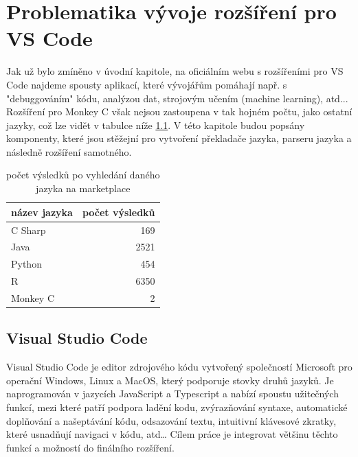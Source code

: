 \chapter{Problematika vývoje rozšíření pro VS Code}

Jak už bylo zmíněno v úvodní kapitole, na oficiálním webu s rozšířeními pro VS Code \cite{marketplace} najdeme spousty aplikací, které vývojářům pomáhají např. s "debuggováním" kódu, analýzou dat, strojovým učením (machine learning), atd... Rozšíření pro Monkey C však nejsou zastoupena v tak hojném počtu, jako ostatní jazyky, což lze vidět v tabulce níže \ref{tab:statsTable}. V této kapitole budou popsány komponenty, které jsou stěžejní pro vytvoření překladače jazyka, parseru jazyka a následně rozšíření samotného.\\

\begin{table}
	\centering
	\caption{počet výsledků po vyhledání daného jazyka na marketplace \cite{marketplace}}
	\label{tab:statsTable}
	\begin{tabular}{lr}
			\toprule
			název jazyka & počet výsledků\\
			\midrule
			C Sharp & 169 \\
			Java & 2521 \\
			Python & 454 \\
			R & 6350 \\
			Monkey C & 2 \\
			\bottomrule
	\end{tabular}
\end{table}

\section{Visual Studio Code}
Visual Studio Code \cite{VSCODE_2020} je editor zdrojového kódu vytvořený společností Microsoft pro operační Windows, Linux a MacOS, který podporuje stovky druhů jazyků. Je naprogramován v jazycích JavaScript a Typescript a nabízí spoustu užitečných funkcí, mezi které patří podpora ladění kodu, zvýrazňování syntaxe, automatické doplňování a našeptávání kódu, odsazování textu, intuitivní klávesové zkratky, které usnadňují navigaci v kódu, atd… Cílem práce je integrovat většinu těchto funkcí a možností do finálního rozšíření.


